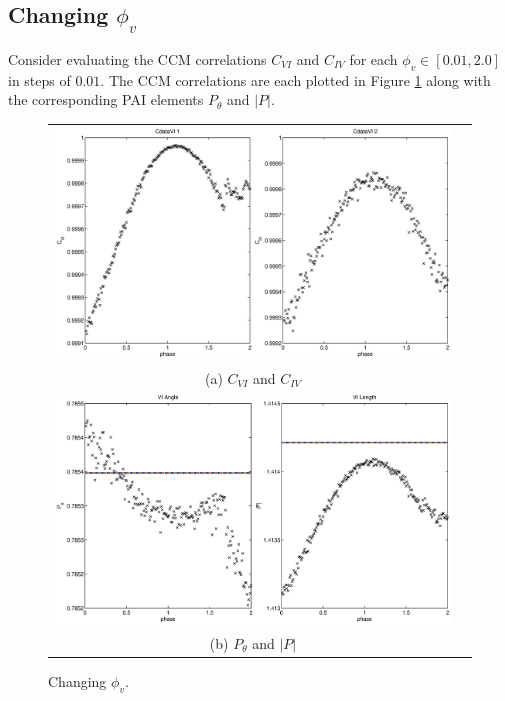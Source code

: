 \documentclass[a4paper,11pt]{article}
\begin{document}
\subsection{Changing $\phi_v$}
Consider evaluating the CCM correlations $C_{VI}$ and $C_{IV}$ for each $\phi_v\in[0.01,2.0]$ in steps of $0.01$.  The CCM correlations are each plotted in Figure \ref{fig:Pv} along with the corresponding PAI elements $P_\theta$ and $|P|$.
\begin{figure}[H]
\begin{tabular}{cc}
\includegraphics[scale=0.5]{RLCircuitPlots/RLcirc_varyV_phase2.eps} \\
(a) $C_{VI}$ and $C_{IV}$ \\[6pt]
\includegraphics[scale=0.5]{RLCircuitPlots/RLcirc_varyV_phase.eps} \\
(b) $P_\theta$ and $|P|$ \\[6pt]
\end{tabular}
\caption{Changing $\phi_v$.}
\label{fig:Pv}
\end{figure}
\end{document}
